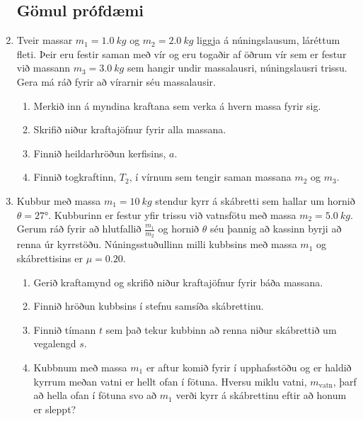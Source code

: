 \begin{enumerate}[label = \textbf{Dæmi \thechapter.\arabic*.}]
\newpage

\subsection*{Gömul prófdæmi}


\item Tveir massar $m_1 = \SI{1.0}{kg}$ og $m_2 = \SI{2.0}{kg}$ liggja á núningslausum, láréttum fleti. Þeir eru festir saman með vír og eru togaðir af öðrum vír sem er festur við massann $m_3 = \SI{3.0}{kg}$ sem hangir undir massalausri, núningslausri trissu. Gera má ráð fyrir að vírarnir séu massalausir.
\begin{enumerate}[label = \textbf{(\alph*)}]
    \item Merkið inn á myndina kraftana sem verka á hvern massa fyrir sig.
    \item Skrifið niður kraftajöfnur fyrir alla massana.
    \item Finnið heildarhröðun kerfisins, $a$.
    \item Finnið togkraftinn, $T_2$, í vírnum sem tengir saman massana $m_2$ og $m_3$.
\end{enumerate}

\begin{center}

\end{center}

\item Kubbur með massa $m_1 = \SI{10}{kg}$ stendur kyrr á skábretti sem hallar um hornið $\theta = \ang{27}$. Kubburinn er festur yfir trissu við vatnsfötu með massa $m_2 = \SI{5.0}{kg}$. Gerum ráð fyrir að hlutfallið $\frac{m_1}{m_2}$ og hornið $\theta$ séu þannig að kassinn byrji að renna úr kyrrstöðu. Núningsstuðullinn milli kubbsins með massa $m_1$ og skábrettisins er $\mu = 0.20$.
\begin{enumerate}[label = \textbf{(\alph*)}]
    \item Gerið kraftamynd og skrifið niður kraftajöfnur fyrir báða massana.
    
    \item Finnið hröðun kubbsins í stefnu samsíða skábrettinu.
    \item  Finnið tímann $t$ sem það tekur kubbinn að renna niður skábrettið um vegalengd $s$.
    \item Kubbnum með massa $m_1$ er aftur komið fyrir í upphafsstöðu og er haldið kyrrum meðan vatni er hellt ofan í fötuna. Hversu miklu vatni, $m_{\text{vatn}}$, þarf að hella ofan í fötuna svo að $m_1$ verði kyrr á skábrettinu eftir að honum er sleppt?
\end{enumerate}


\end{enumerate}
